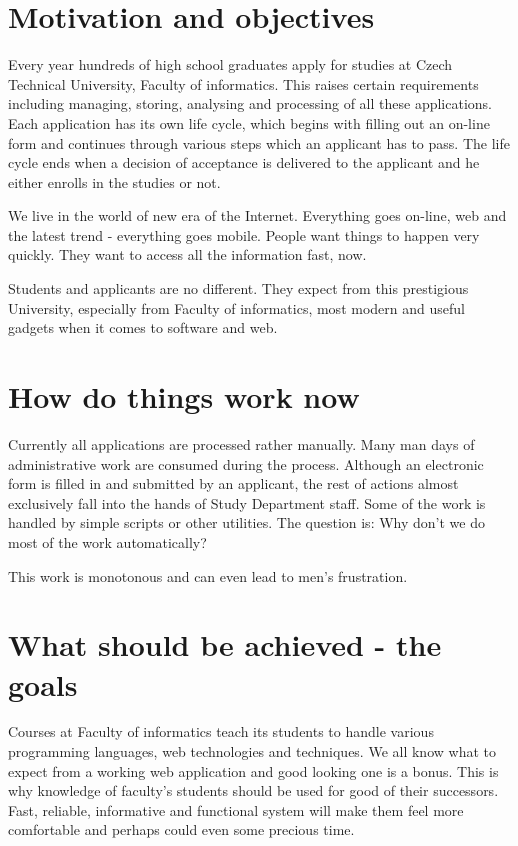 \begin{introduction}
	\section{Motivation and objectives}

	Every year hundreds of high school graduates apply for studies at Czech Technical University, Faculty of informatics.
	This raises certain requirements including managing, storing, analysing and processing of all these applications.
	Each application has its own life cycle, which begins with filling out an on-line form and continues through various
	steps which an applicant has to pass. The life cycle ends when a decision of acceptance is delivered to the applicant
	and he either enrolls in the studies or not.
	
	We live in the world of new era of the Internet. Everything goes on-line, web and the latest trend - everything goes
	mobile. People want things to happen very quickly. They want to access all the information fast, now.
	
	Students and applicants are no different. They expect from this prestigious University, especially from Faculty of
	informatics, most modern and useful gadgets when it comes to software and web.
	
	\section{How do things work now}
	
	Currently all applications are processed rather manually. Many man days of administrative work are consumed during the
	process. Although an electronic form is filled in and submitted by an applicant, the rest of actions almost exclusively
	fall into the hands of Study Department staff. Some of the work is handled by simple scripts or other utilities. The
	question is: Why don't we do most of the work automatically?
	
	This work is monotonous and can even lead to men's frustration.
	
	\section{What should be achieved - the goals}
	
	Courses at Faculty of informatics teach its students to handle various programming languages, web technologies and
	techniques.
	We all know what to expect from a working web application and good looking one is a bonus. This is why knowledge of
	faculty's students should be used for good of their successors. Fast, reliable, informative and functional system will
	make them feel more comfortable and perhaps could even some precious time.
	

\end{introduction}
